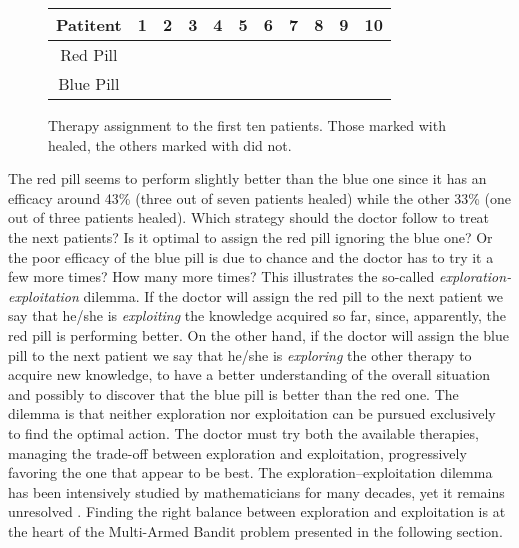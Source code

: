 \begin{figure}[H]
	\centering
	\begin{tabular}{|c|l|lcccccccccc|}
		\hline
		\multicolumn{3}{|c}{\textbf{Patitent}} & 1      & 2      & 3      & 4      & 5      & 6      & 7      & 8      & 9      & 10     \\ \hline
		\multicolumn{3}{|c}{Red Pill}          & \xmark &        &        & \xmark &        & \cmark & \cmark & \cmark & \xmark & \xmark \\
		\multicolumn{3}{|c}{Blue Pill}         &        & \cmark & \xmark &        & \xmark &        &        &        &        &        \\ \hline
	\end{tabular}
	
	\caption{Therapy assignment to the first ten patients. Those marked with \cmark healed, the others marked with \xmark  did not. }
	\label{f:clinical}
\end{figure}
The red pill seems to perform slightly better than the blue one since it has an efficacy around 43\% (three out of seven patients healed) while the other 33\% (one out of three patients healed). Which strategy should the doctor follow to treat the next patients? Is it optimal to assign the red pill ignoring the blue one? Or the poor efficacy of the blue pill is due to chance and the doctor has to try it a few more times? How many more times? This illustrates the so-called 	\emph{exploration-exploitation} dilemma. If the doctor will assign the red pill to the next patient we say that he/she is \emph{exploiting} the knowledge acquired so far, since, apparently, the red pill is performing better. On the other hand, if the doctor will assign the blue pill to the next patient we say that he/she is \emph{exploring} the other therapy to acquire new knowledge, to have a better understanding of the overall situation and possibly to discover that the blue pill is better than the red one. The dilemma is that neither exploration nor exploitation can be pursued exclusively to find the optimal action. The doctor must try both the available therapies, managing the trade-off between exploration and exploitation, progressively favoring the one that appear to be best. The exploration–exploitation dilemma has been intensively studied by mathematicians for many decades, yet it remains unresolved \citep{sutton2018reinforcement}. Finding the right balance between exploration and exploitation is at the heart of the Multi-Armed Bandit problem presented in the following section.
